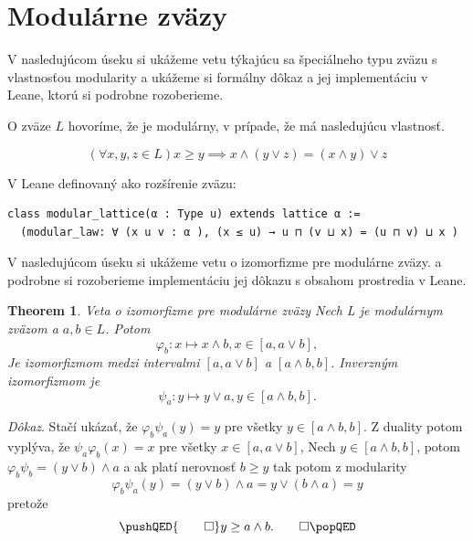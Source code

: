 \documentclass[a4paper,10pt,oneside]{report}%
\newtheorem{theorem}{Theorem}
\begin{document}
\section{Modulárne zväzy}

    V nasledujúcom úseku si ukážeme vetu týkajúcu sa špeciálneho typu zväzu s vlastnosťou
modularity a ukážeme si formálny dôkaz a jej implementáciu v Leane, ktorú si
podrobne rozoberieme.

    O zväze $L$ hovoríme, že je modulárny, v prípade, že má nasledujúcu vlastnosť.

\begin{equation*}
    (\forall x,y,z \in L) x \geq y \implies x \wedge ( y \vee z) = (x \wedge y) \vee z
\end{equation*}

    V Leane definovaný ako rozšírenie zväzu:

\begin{lstlisting}
class modular_lattice(α : Type u) extends lattice α :=
  (modular_law: ∀ (x u v : α ), (x ≤ u) → u ⊓ (v ⊔ x) = (u ⊓ v) ⊔ x )
\end{lstlisting}

    V nasledujúcom úseku si ukážeme vetu o izomorfizme pre modulárne zväzy. a podrobne 
si rozoberieme implementáciu jej dôkazu s obsahom prostredia v Leane.

\begin{theorem} \emph{Veta o izomorfizme pre modulárne zväzy}
Nech L je modulárnym zväzom a $a, b \in L$. Potom
    \begin{equation}
        \varphi_{b}: x \mapsto x \wedge b, x \in [a, a \vee b],
    \end{equation}
Je izomorfizmom medzi intervalmi $[a, a \vee b]$ a $[ a \wedge b, b]$.
Inverzným izomorfizmom je
    \begin{equation}
        \psi_{a}: y \mapsto y \vee a, y \in [a \wedge b, b].
    \end{equation}
\end{theorem}
\emph{Dôkaz}.
    Stačí ukázať, že $\varphi_{b}\psi_{a}(y) = y$ pre všetky $y \in [a \wedge b, b]$.
    Z duality potom vyplýva, že $\psi_{a}\varphi_{b}(x) = x$ pre všetky
$x \in [a, a \vee b ]$,
    Nech $y \in [ a \wedge b, b ]$, potom $\varphi_{b}\psi_{b} = ( y \vee b ) \wedge a$ 
a ak platí nerovnosť $b \geq y$ tak potom z modularity
    \begin{equation}
        \varphi_{b}\psi_{a}(y) =
        ( y \vee b ) \wedge a =
        y \vee ( b \wedge a) =
        y
    \end{equation}
    pretože
    \[
        \pushQED{\qed}
        y \geq a \wedge b. \qedhere
        \popQED
    \]
\end{document}
